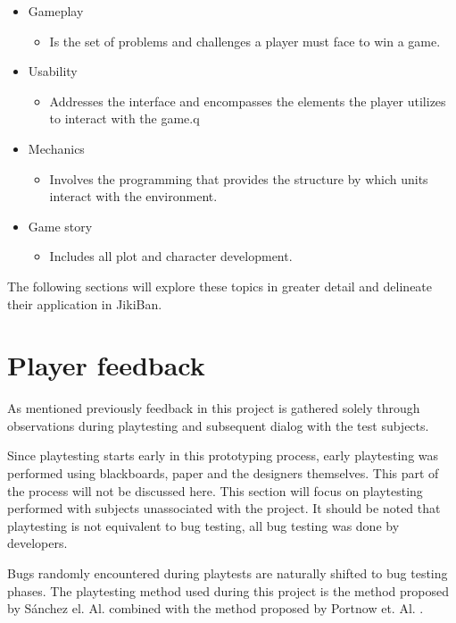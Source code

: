 \begin{itemize}

\item Gameplay
\begin{itemize}
\item Is the set of problems and challenges a player must face to win a game.
\end{itemize}

\item Usability
\begin{itemize}
\item Addresses the interface and encompasses the elements the player
  utilizes to interact with the game.q
\end{itemize}

\item Mechanics
\begin{itemize}
\item Involves the programming that provides the structure by which
  units interact with the environment.
\end{itemize}

\item Game story
\begin{itemize}
\item Includes all plot and character development.
\end{itemize}
\end{itemize}

The following sections will explore these topics in greater detail and
delineate their application in JikiBan.


\section{Player feedback}
\label{player-feedback}
As mentioned previously feedback in this project is gathered solely
through observations during playtesting and subsequent dialog with the
test subjects.

Since playtesting starts early in this prototyping process, early
playtesting was performed using blackboards, paper and the designers
themselves. This part of the process will not be discussed here.  This
section will focus on playtesting performed with subjects unassociated
with the project.  It should be noted that playtesting is not
equivalent to bug testing, all bug testing was done by developers.

Bugs randomly encountered during playtests are naturally shifted to
bug testing phases.  The playtesting method used during this project
is the method proposed by Sánchez el. Al. \cite{sanchez09} combined
with the method proposed by Portnow et. Al. \cite{portnow}.

